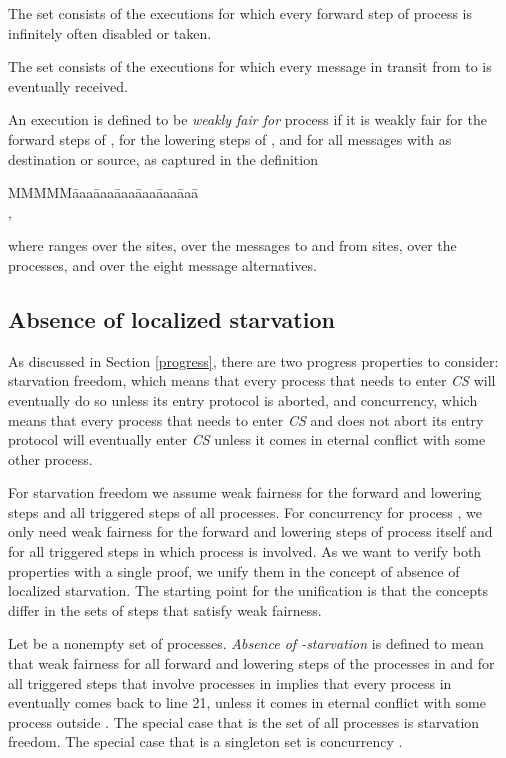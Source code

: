 \documentclass[10pt]{article} \usepackage[english]{babel}
\newenvironment{tab}{\begin{tabbing}
MMMMM\=aaa\=aaa\=aaa\=aaa\=aaa\=aaa\= \kill}{\end{tabbing}}
\def\S #1/{\mbox {\textsl{#1}}}
\begin{document}
The set  consists of the executions for which
every forward step of process  is infinitely often disabled or
taken.

The set  consists of the executions for which
every message  in transit from  to  is eventually received.

An execution is defined to be \emph{weakly fair for} process  if it
is weakly fair for the forward steps of , for the lowering steps of
, and for all messages with  as destination or source, as
captured in the definition
\begin{tab}
  \> \\
  \>\>\>  ,
\end{tab}
where  ranges over the sites,  over the messages to and from
sites,  over the processes, and  over the eight message
alternatives.

\subsection{Absence of localized starvation} \label{s.liveness}

As discussed in Section \ref{progress}, there are two progress
properties to consider: starvation freedom, which means that every
process that needs to enter \S CS/ will eventually do so unless its
entry protocol is aborted, and concurrency, which means that every
process that needs to enter \S CS/ and does not abort its entry
protocol will eventually enter \S CS/ unless it comes in eternal
conflict with some other process.

For starvation freedom we assume weak fairness for the forward and
lowering steps and all triggered steps of all processes.  For
concurrency for process , we only need weak fairness for the
forward and lowering steps of process  itself and for all triggered
steps in which process  is involved.  As we want to verify both
properties with a single proof, we unify them in the concept of
{absence of localized starvation}.  The starting point for the
unification is that the concepts differ in the sets of steps that
satisfy weak fairness.

Let  be a nonempty set of processes.  \emph{Absence of
  -starvation} is defined to mean that weak fairness for all
forward and lowering steps of the processes in  and for all
triggered steps that involve processes in  implies that every
process in  eventually comes back to line 21, unless it comes in
eternal conflict with some process outside .  The special case that
 is the set of all processes is starvation freedom.  The special
case that  is a singleton set is concurrency \cite{ChM84,Rhe98}.
\end{document}
